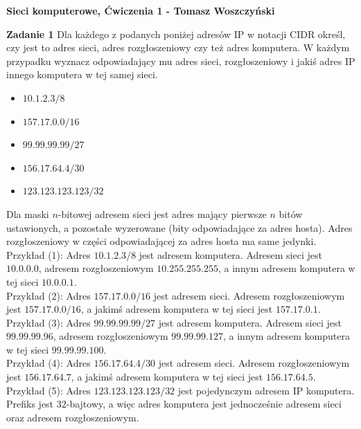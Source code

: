 \documentclass[a4paper,12pt]{article}
\begin{document}
\noindent \textbf{Sieci komputerowe, Ćwiczenia 1 - Tomasz Woszczyński}\newline

\noindent \newline \textbf{Zadanie 1} \newline
Dla każdego z podanych poniżej adresów IP w notacji CIDR określ, czy jest to
adres sieci, adres rozgłoszeniowy czy też adres komputera. W każdym przypadku
wyznacz odpowiadający mu adres sieci, rozgłoszeniowy i jakiś adres IP innego
komputera w tej samej sieci.

\begin{itemize}
    \item $10.1.2.3/8$
    \item $157.17.0.0/16$
    \item $99.99.99.99/27$
    \item $156.17.64.4/30$
    \item $123.123.123.123/32$
\end{itemize}

\noindent Dla maski $n$-bitowej adresem sieci jest adres mający pierwsze $n$ bitów
ustawionych, a pozostałe wyzerowane (bity odpowiadające za adres hosta). Adres
rozgłoszeniowy w części odpowiadającej za adres hosta ma same jedynki. \\

\noindent Przykład (1): Adres $10.1.2.3/8$ jest adresem komputera. Adresem 
sieci jest $10.0.0.0$, adresem rozgłoszeniowym $10.255.255.255$, a innym
adresem komputera w tej sieci $10.0.0.1$. \\

\noindent Przykład (2): Adres $157.17.0.0/16$ jest adresem sieci. Adresem
rozgłoszeniowym jest $157.17.0.0/16$, a jakimś adresem komputera w tej sieci
jest $157.17.0.1$. \\

\noindent Przykład (3): Adres $99.99.99.99/27$ jest adresem komputera. Adresem
sieci jest $99.99.99.96$, adresem rozgłoszeniowym $99.99.99.127$, a innym
adresem komputera w tej sieci $99.99.99.100$. \\

\noindent Przykład (4): Adres $156.17.64.4/30$ jest adresem sieci. Adresem 
rozgłoszeniowym jest $156.17.64.7$, a jakimś adresem komputera w tej sieci
jest $156.17.64.5$. \\

\noindent Przykład (5): Adres $123.123.123.123/32$ jest pojedynczym adresem
IP komputera. Prefiks jest $32$-bajtowy, a więc adres komputera jest 
jednocześnie adresem sieci oraz adresem rozgłoszeniowym.
\end{document}
